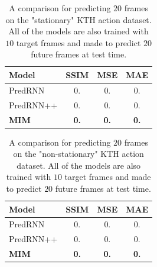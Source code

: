 \documentclass[10pt,twocolumn,letterpaper]{article}
\begin{document}
\begin{table}[h]
  \caption{A comparison for predicting $20$ frames on the "stationary" KTH action dataset. All of the models are also trained with $10$ target frames and made to predict $20$ future frames at test time.}
  \label{tab:KTH_s_20_result}
  \vskip 0.15in
  \centering
  \begin{small}
  \begin{sc}
  \renewcommand{\multirowsetup}{\centering}  
  \begin{tabular}{lccc}
    \toprule
    Model & SSIM & MSE & MAE\\
    \midrule
    PredRNN & 0. & 0. & 0. \\
    PredRNN++ & 0. & 0. & 0. \\
    \midrule
    \textbf{MIM} & \textbf{0.} & \textbf{0.} & \textbf{0.} \\
    \bottomrule
  \end{tabular}
  \end{sc}
  \end{small}
\end{table}

\begin{table}[h]
  \caption{A comparison for predicting $20$ frames on the "non-stationary" KTH action dataset. All of the models are also trained with $10$ target frames and made to predict $20$ future frames at test time.}
  \label{tab:KTH_n_20_result}
  \vskip 0.15in
  \centering
  \begin{small}
  \begin{sc}
  \renewcommand{\multirowsetup}{\centering}  
  \begin{tabular}{lccc}
    \toprule
    Model & SSIM & MSE & MAE\\
    \midrule
    PredRNN & 0. & 0. & 0. \\
    PredRNN++ & 0. & 0. & 0. \\
    \midrule
    \textbf{MIM} & \textbf{0.} & \textbf{0.} & \textbf{0.} \\
    \bottomrule
  \end{tabular}
  \end{sc}
  \end{small}
\end{table}
\end{document}
